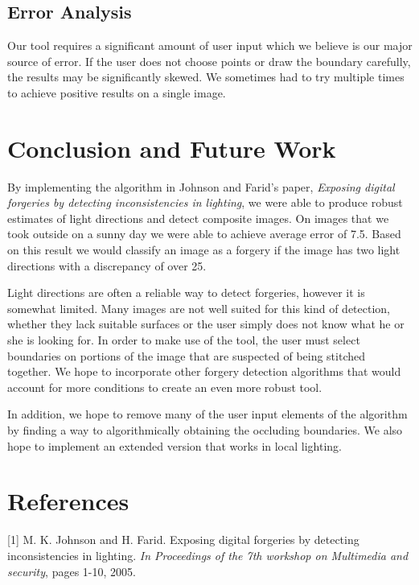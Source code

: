 \documentclass[10pt,twocolumn,letterpaper]{article}
\begin{document}

\subsection{Error Analysis}
Our tool requires a significant amount of user input which we believe is our major source of error. If the user does not choose points or draw the boundary carefully, the results may be significantly skewed. We sometimes had to try multiple times to achieve positive results on a single image.

\section{Conclusion and Future Work}
By implementing the algorithm in Johnson and Farid's paper, \emph{Exposing digital forgeries by detecting inconsistencies in lighting}, we were able to produce robust estimates of light directions and detect composite images. On images that we took outside on a sunny day we were able to achieve average error of 7.5\textdegree. Based on this result we would classify an image as a forgery if the image has two light directions with a discrepancy of over 25\textdegree. 
 
Light directions are often a reliable way to detect forgeries, however it is somewhat limited. Many images are not well suited for this kind of detection, whether they lack suitable surfaces or the user simply does not know what he or she is looking for. In order to make use of the tool, the user must select boundaries on portions of the image that are suspected of being stitched together. We hope to incorporate other forgery detection algorithms that would account for more conditions to create an even more robust tool.

In addition, we hope to remove many of the user input elements of the algorithm by finding a way to algorithmically obtaining the occluding boundaries. We also hope to implement an extended version that works in local lighting.
\section{References}

[1] M. K. Johnson and H. Farid. Exposing digital forgeries by detecting inconsistencies in lighting. \emph{In Proceedings of the 7th workshop on Multimedia and security}, pages 1-10, 2005.
\end{document}
